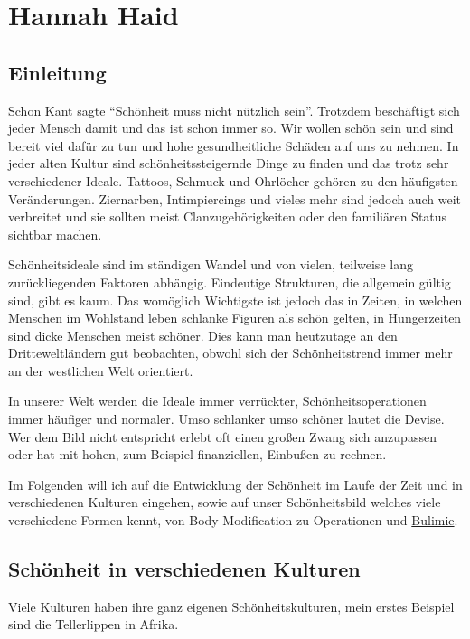 \chapter{Hannah Haid}
\label{sec:Hannah_Haid}

\section{Einleitung}
Schon Kant sagte \enquote{Schönheit muss nicht nützlich sein}. Trotzdem beschäftigt sich jeder Mensch damit
und das ist schon immer so. Wir wollen schön sein und sind bereit viel dafür zu tun und hohe
gesundheitliche Schäden auf uns zu nehmen. In jeder alten Kultur sind schönheitssteigernde Dinge zu
finden und das trotz sehr verschiedener Ideale. Tattoos, Schmuck und Ohrlöcher gehören zu den
häufigsten Veränderungen. Ziernarben, Intimpiercings und vieles mehr sind jedoch auch weit
verbreitet und
sie sollten meist Clanzugehörigkeiten oder den familiären Status
sichtbar machen.

Schönheitsideale sind im ständigen Wandel und von vielen, teilweise lang zurückliegenden
Faktoren abhängig. Eindeutige Strukturen, die allgemein gültig sind, gibt es kaum. Das
womöglich
Wichtigste ist jedoch das in Zeiten, in welchen Menschen im Wohlstand leben schlanke Figuren als
schön
gelten, in Hungerzeiten sind dicke Menschen meist schöner. Dies kann man heutzutage an den
Dritteweltländern gut beobachten, obwohl sich der Schönheitstrend immer mehr an der westlichen Welt
orientiert.

In unserer Welt werden die Ideale immer verrückter, Schönheitsoperationen immer häufiger und
normaler. Umso schlanker umso schöner lautet die Devise. Wer dem Bild nicht entspricht erlebt oft
einen großen Zwang sich anzupassen oder hat mit hohen, zum Beispiel finanziellen, Einbußen zu
rechnen.

Im Folgenden will ich auf die Entwicklung der Schönheit im Laufe der Zeit und in verschiedenen
Kulturen
eingehen, sowie auf unser Schönheitsbild welches viele verschiedene Formen kennt, von Body
Modification zu Operationen und \href{http://de.wikipedia.org/wiki/Bulimie}{Bulimie}.

\clearpage
\section{Schönheit in verschiedenen Kulturen}
Viele Kulturen haben ihre ganz eigenen Schönheitskulturen, mein erstes Beispiel sind die
Tellerlippen in Afrika.

